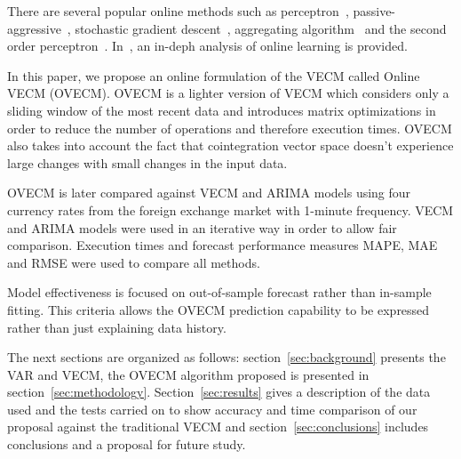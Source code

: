 There are several popular online methods such as perceptron~\cite{rosenblatt58},
passive-aggressive~\cite{crammerETall2006}, stochastic gradient
descent~\cite{zhang2004}, aggregating algorithm~\cite{vovk2001} and the second
order perceptron~\cite{cesa-bianchi2005}.  In~\cite{cesa-bianchi2006}, an
in-deph analysis of online learning is provided. 

In this paper, we propose an online formulation of the VECM called Online VECM
(OVECM). OVECM is a lighter version of VECM which considers only a sliding window
of the most recent data and introduces matrix optimizations in order to reduce
the number of operations and therefore execution times. OVECM also takes into
account the fact that cointegration vector space doesn't experience large
changes with small changes in the input data. 

OVECM is later compared against VECM and ARIMA models using four currency rates
from the foreign exchange market with 1-minute frequency. VECM and ARIMA models
were used in an iterative way in order to allow fair comparison. Execution times
and forecast performance measures MAPE, MAE and RMSE were used to compare all
methods. 

Model effectiveness is focused on out-of-sample forecast rather than in-sample
fitting. This criteria allows the OVECM prediction capability to be expressed
rather than just explaining data history.

The next sections are organized as follows: section~\ref{sec:background}
presents the VAR and VECM, the OVECM algorithm proposed is presented in
section~\ref{sec:methodology}. Section~\ref{sec:results} gives a description of
the data used and the tests carried on to show accuracy and time comparison of
our proposal against the traditional VECM and
section~\ref{sec:conclusions} includes conclusions and a proposal for future study.
